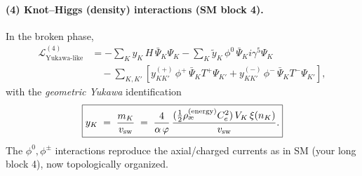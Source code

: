\documentclass[11pt]{article}
\begin{document}
    \paragraph{(4) Knot--Higgs (density) interactions (SM block 4).}
    In the broken phase,
    \begin{align}
        \mathcal{L}^{(4)}_{\text{Yukawa-like}}
        &= -\sum_K y_K\, H\, \bar{\Psi}_K \Psi_K
        -\sum_K \tilde{y}_K\, \phi^0\, \bar{\Psi}_K i\gamma^5 \Psi_K
        \nonumber\\
        &\quad - \sum_{K,K'} \left[ y_{KK'}^{(+)}\, \phi^+\, \bar{\Psi}_K T^+ \Psi_{K'}
                                 + y_{KK'}^{(-)}\, \phi^-\, \bar{\Psi}_K T^- \Psi_{K'}  \right],
    \end{align}
    with the \emph{geometric Yukawa} identification
    \begin{align}
        \boxed{
            y_K \;=\; \frac{m_K}{v_\text{sw}} \;=\;
            \frac{4}{\alphaEM\,\phiG}\,
            \frac{(\tfrac{1}{2}\rhoe \Ce^2)\, V_K\, \xi(n_K)}{v_\text{sw}}.
        }
    \end{align}
    The $\phi^0,\phi^\pm$ interactions reproduce the axial/charged currents as in SM (your long block 4), now topologically organized.

\end{document}
